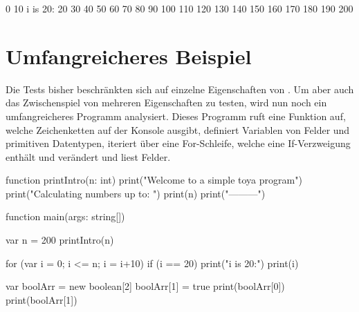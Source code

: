 
\begin{ToyaCode}[numbers=none, caption={Konsolen-Ausgabe der For-Schleife}]
0
10
i is 20:
20
30
40
50
60
70
80
90
100
110
120
130
140
150
160
170
180
190
200
\end{ToyaCode}

\section{Umfangreicheres Beispiel}
Die Tests bisher beschränkten sich auf einzelne Eigenschaften von \toya. Um aber auch das Zwischenspiel von mehreren Eigenschaften zu testen, wird nun noch ein umfangreicheres Programm analysiert. Dieses Programm ruft eine Funktion auf, welche Zeichenketten auf der Konsole ausgibt, definiert Variablen von Felder und primitiven Datentypen, iteriert über eine For-Schleife, welche eine If-Verzweigung enthält und verändert und liest Felder.

\begin{ToyaCode}[numbers=none, caption={Quelltext des umfangereicheren Beispiels}]
function printIntro(n: int) {
    print("Welcome to a simple toya program")
    print("Calculating numbers up to: ")
    print(n)
    print("---------")
}

function main(args: string[]) {
    var n = 200
    printIntro(n)

    for (var i = 0; i <= n; i = i+10) {
        if (i == 20) {
            print("i is 20:")
        }
        print(i)
    }

    var boolArr = new boolean[2]
    boolArr[1] = true
    print(boolArr[0])
    print(boolArr[1])
}
\end{ToyaCode}

